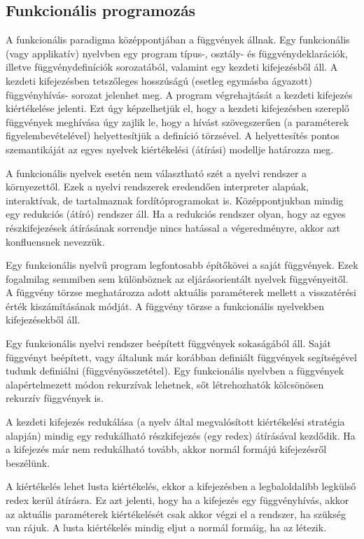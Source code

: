 \subsection{Funkcionális programozás}
A funkcionális paradigma középpontjában a függvények állnak. Egy funkcionális (vagy applikatív) nyelvben egy program típus-, osztály- és függvénydeklarációk, illetve függvénydefiníciók sorozatából, valamint egy kezdeti kifejezésből áll. A kezdeti kifejezésben tetszőleges hosszúságú (esetleg egymásba ágyazott) függvényhívás- sorozat jelenhet meg. A program végrehajtását a kezdeti kifejezés kiértékelése jelenti. Ezt úgy képzelhetjük el, hogy a kezdeti kifejezésben szereplő függvények meghívása úgy zajlik le, hogy a hívást szövegszerűen (a paraméterek figyelembevételével) helyettesítjük a definíció törzsével. A helyettesítés pontos szemantikáját az egyes nyelvek kiértékelési (átírási) modellje határozza meg. 

A funkcionális nyelvek esetén nem választható szét a nyelvi rendszer a környezettől. Ezek a nyelvi rendszerek eredendően interpreter alapúak, interaktívak, de tartalmaznak fordítóprogramokat is. Középpontjukban mindig egy redukciós (átíró) rendszer áll. Ha a redukciós rendszer olyan, hogy az egyes részkifejezések átírásának sorrendje nincs hatással a végeredményre, akkor azt konfluensnek nevezzük. 

Egy funkcionális nyelvű program legfontosabb építőkövei a saját függvények. Ezek fogalmilag semmiben sem különböznek az eljárásorientált nyelvek függvényeitől. A függvény törzse meghatározza adott aktuális paraméterek mellett a visszatérési érték kiszámításának módját. A függvény törzse a funkcionális nyelvekben kifejezésekből áll. 

Egy funkcionális nyelvi rendszer beépített függvények sokaságából áll. Saját függvényt beépített, vagy általunk már korábban definiált függvények segítségével tudunk definiálni (függvényösszetétel). Egy funkcionális nyelvben a függvények alapértelmezett módon rekurzívak lehetnek, sőt létrehozhatók kölcsönösen rekurzív függvények is. 

A kezdeti kifejezés redukálása (a nyelv által megvalósított kiértékelési stratégia alapján) mindig egy redukálható részkifejezés (egy redex) átírásával kezdődik. Ha a kifejezés már nem redukálható tovább, akkor normál formájú kifejezésről beszélünk. 

A kiértékelés lehet lusta kiértékelés, ekkor a kifejezésben a legbaloldalibb legkülső redex kerül átírásra. Ez azt jelenti, hogy ha a kifejezés egy függvényhívás, akkor az aktuális paraméterek kiértékelését csak akkor végzi el a rendszer, ha szükség van rájuk. A lusta kiértékelés mindig eljut a normál formáig, ha az létezik. 

